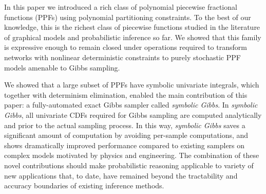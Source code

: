 \documentclass[]{article}
\begin{document}
In this paper we introduced a rich class of polynomial piecewise
fractional functions (PPFs) using polynomial partitioning constraints.
To the best of our knowledge, this is the richest class of piecewise
functions studied in the literature of graphical models and
probabilistic inference so far.  We showed that this family is
expressive enough to remain closed under operations required to
transform networks with nonlinear deterministic constraints to purely
stochastic PPF models amenable to Gibbs sampling.

We showed that a large subset of PPFs have symbolic univariate
integrals, which together with determinism elimination, enabled the
main contribution of this paper: a fully-automated exact Gibbs sampler
called \emph{symbolic Gibbs}.  In \emph{symbolic Gibbs}, all
univariate CDFs required for Gibbs sampling are computed analytically
and prior to the actual sampling process.  In this way, \emph{symbolic
  Gibbs} saves a significant amount of computation by avoiding
per-sample computations, and shows dramatically improved performance
compared to existing samplers on complex models motivated by physics
and engineering. The combination of these novel contributions should
make probabilistic reasoning applicable to variety of new applications
that, to date, have remained beyond the tractability and accuracy
boundaries of existing inference methods.




\end{document}
